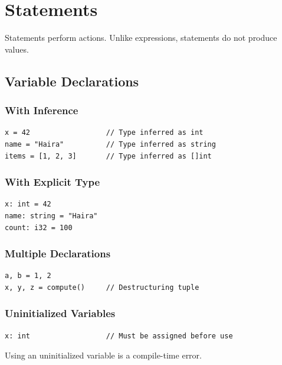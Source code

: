 \chapter{Statements}
\label{ch:statements}

Statements perform actions. Unlike expressions, statements do not produce values.

\section{Variable Declarations}

\subsection{With Inference}

\begin{lstlisting}
x = 42                  // Type inferred as int
name = "Haira"          // Type inferred as string
items = [1, 2, 3]       // Type inferred as []int
\end{lstlisting}

\subsection{With Explicit Type}

\begin{lstlisting}
x: int = 42
name: string = "Haira"
count: i32 = 100
\end{lstlisting}

\subsection{Multiple Declarations}

\begin{lstlisting}
a, b = 1, 2
x, y, z = compute()     // Destructuring tuple
\end{lstlisting}

\subsection{Uninitialized Variables}

\begin{lstlisting}
x: int                  // Must be assigned before use
\end{lstlisting}

\begin{warning}
Using an uninitialized variable is a compile-time error.
\end{warning}

